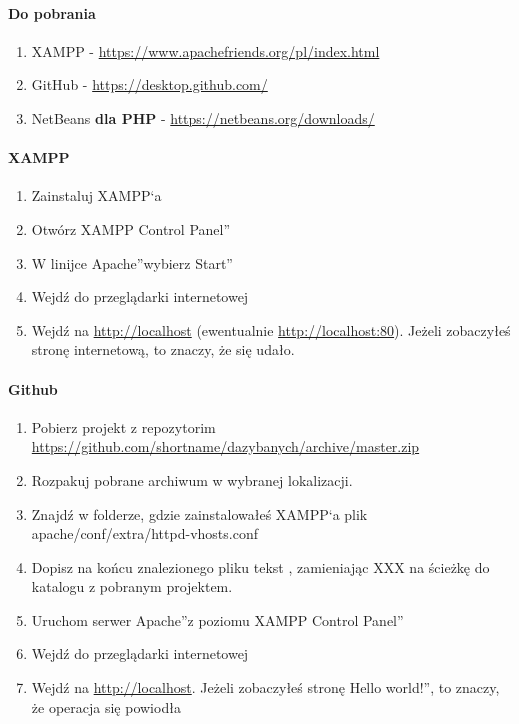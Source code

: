 \documentclass[a4paper, 12pt]{article}
\begin{document}
\paragraph{Do pobrania}
\begin{enumerate}
	\item XAMPP - \url{https://www.apachefriends.org/pl/index.html}
	\item GitHub - \url{https://desktop.github.com/}
	\item NetBeans \textbf{dla PHP} - {\url{https://netbeans.org/downloads/}}
\end{enumerate}
\paragraph{XAMPP}
\begin{enumerate}
	\item Zainstaluj XAMPP`a
	\item Otwórz \quotedblbase XAMPP Control Panel\textquotedblright
	\item W linijce \quotedblbase Apache\textquotedblright wybierz \quotedblbase Start\textquotedblright
	\item Wejdź do przeglądarki internetowej
	\item Wejdź na \url{http://localhost} (ewentualnie \url{http://localhost:80}). Jeżeli zobaczyłeś stronę internetową, to znaczy, że się udało.
\end{enumerate}
\paragraph{Github}
\begin{enumerate}
	\item Pobierz projekt z repozytorim \url{https://github.com/shortname/dazybanych/archive/master.zip}
	\item Rozpakuj pobrane archiwum w wybranej lokalizacji.
	\item Znajdź w folderze, gdzie zainstalowałeś XAMPP`a plik apache/conf/extra/httpd-vhosts.conf
	\item Dopisz na końcu znalezionego pliku tekst , zamieniając XXX na ścieżkę do katalogu z pobranym projektem.
	\item Uruchom serwer \quotedblbase Apache\textquotedblright z poziomu \quotedblbase XAMPP Control Panel\textquotedblright
	\item Wejdź do przeglądarki internetowej
	\item Wejdź na \url{http://localhost}. Jeżeli zobaczyłeś stronę \quotedblbase Hello world!\textquotedblright, to znaczy, że operacja się powiodła
\end{enumerate}
\end{document}

